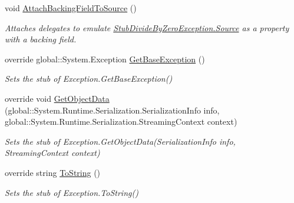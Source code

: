\begin{DoxyCompactItemize}
void \hyperlink{class_system_1_1_fakes_1_1_stub_divide_by_zero_exception_a2f286a57479bc628f3db03b106c79fbf}{Attach\-Backing\-Field\-To\-Source} ()
\begin{DoxyCompactList}\small\item\em Attaches delegates to emulate \hyperlink{class_system_1_1_fakes_1_1_stub_divide_by_zero_exception_acf140598d6951ccd6384a33f2036eb25}{Stub\-Divide\-By\-Zero\-Exception.\-Source} as a property with a backing field.\end{DoxyCompactList}\item 
override global\-::\-System.\-Exception \hyperlink{class_system_1_1_fakes_1_1_stub_divide_by_zero_exception_a9c081b50e83d080d64e35da8ebb120fc}{Get\-Base\-Exception} ()
\begin{DoxyCompactList}\small\item\em Sets the stub of Exception.\-Get\-Base\-Exception()\end{DoxyCompactList}\item 
override void \hyperlink{class_system_1_1_fakes_1_1_stub_divide_by_zero_exception_a37e4c01ebb4c6c3c8b0ba453345c5963}{Get\-Object\-Data} (global\-::\-System.\-Runtime.\-Serialization.\-Serialization\-Info info, global\-::\-System.\-Runtime.\-Serialization.\-Streaming\-Context context)
\begin{DoxyCompactList}\small\item\em Sets the stub of Exception.\-Get\-Object\-Data(\-Serialization\-Info info, Streaming\-Context context)\end{DoxyCompactList}\item 
override string \hyperlink{class_system_1_1_fakes_1_1_stub_divide_by_zero_exception_ab59ad77d9288a8b3d85cfa437c5e63b5}{To\-String} ()
\begin{DoxyCompactList}\small\item\em Sets the stub of Exception.\-To\-String()\end{DoxyCompactList}\end{DoxyCompactItemize}
